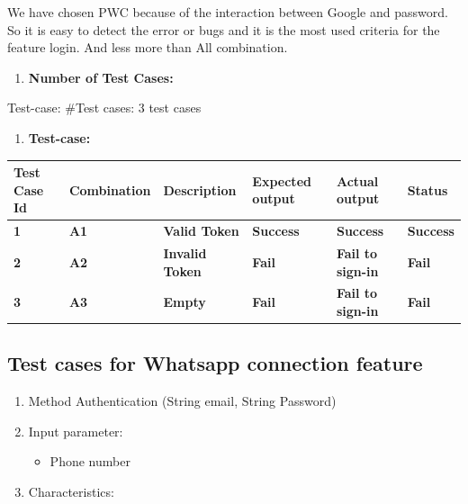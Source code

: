 \noindent
We have chosen PWC because of the interaction between Google and password. So it is easy to detect the error or bugs and it is the most used criteria for the feature login. And less more than All combination.

\begin{enumerate}[resume]
    \item \textbf{Number of Test Cases:}
\end{enumerate}

\noindent
Test-case: \#Test cases: 3 test cases

\begin{enumerate}[resume]
    \item \textbf{Test-case:}
\end{enumerate}

\begin{longtable}{|p{1cm}|p{2cm}|p{3cm}|p{2.5cm}|p{3cm}|p{1.5cm}|}
\hline
\textbf{Test Case Id} & \textbf{Combination} & \textbf{Description} & \textbf{Expected output} & \textbf{Actual output} & \textbf{Status} \\
\hline
\textbf{1} & \textbf{A1} & \textbf{Valid Token} & \textbf{Success} & \textbf{Success} & \textbf{Success} \\
\hline
\textbf{2} & \textbf{A2} & \textbf{Invalid Token} & \textbf{Fail} & \textbf{Fail to sign-in} & \textbf{Fail} \\
\hline
\textbf{3} & \textbf{A3} & \textbf{Empty} & \textbf{Fail} & \textbf{Fail to sign-in} & \textbf{Fail} \\
\hline
\end{longtable}

\subsection*{Test cases for Whatsapp connection feature}

\begin{enumerate}
    \item Method Authentication (String email, String Password)
    \item Input parameter:
    \begin{itemize}
        \item Phone number
    \end{itemize}
    \item Characteristics:
\end{enumerate}

